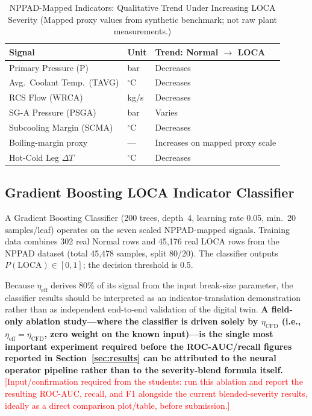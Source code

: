 \documentclass[journal]{IEEEtran}
\begin{document}
\begin{table}[htbp]
\caption{NPPAD-Mapped Indicators: Qualitative Trend Under Increasing LOCA Severity (Mapped proxy values from synthetic benchmark; not raw plant measurements.)}
\label{tab:nppad}
\centering
\begin{tabular}{lll}
\toprule
\textbf{Signal} & \textbf{Unit} & \textbf{Trend: Normal $\to$ LOCA} \\
\midrule
Primary Pressure (P) & bar & Decreases \\
Avg.\ Coolant Temp.\ (TAVG) & $^\circ$C & Decreases \\
RCS Flow (WRCA) & kg/s & Decreases \\
SG-A Pressure (PSGA) & bar & Varies \\
Subcooling Margin (SCMA) & $^\circ$C & Decreases \\
Boiling-margin proxy & --- & Increases on mapped proxy scale \\
Hot-Cold Leg $\Delta T$ & $^\circ$C & Decreases \\
\bottomrule
\end{tabular}
\end{table}

\subsection{Gradient Boosting LOCA Indicator Classifier}

A Gradient Boosting Classifier (200 trees, depth~4, learning rate 0.05, min.\ 20 samples/leaf) operates on the seven scaled NPPAD-mapped signals. Training data combines 302 real Normal rows and 45,176 real LOCA rows from the NPPAD dataset (total 45,478 samples, split 80/20). The classifier outputs $P(\text{LOCA}) \in [0,1]$; the decision threshold is 0.5.

Because $\eta_\text{eff}$ derives 80\% of its signal from the input break-size parameter, the classifier results should be interpreted as an indicator-translation demonstration rather than as independent end-to-end validation of the digital twin. \textbf{A field-only ablation study---where the classifier is driven solely by $\eta_\text{CFD}$ (i.e., $\eta_\text{eff} = \eta_\text{CFD}$, zero weight on the known input)---is the single most important experiment required before the ROC-AUC/recall figures reported in Section~\ref{sec:results} can be attributed to the neural operator pipeline rather than to the severity-blend formula itself.} \textcolor{red}{[Input/confirmation required from the students: run this ablation and report the resulting ROC-AUC, recall, and F1 alongside the current blended-severity results, ideally as a direct comparison plot/table, before submission.]}
\end{document}
